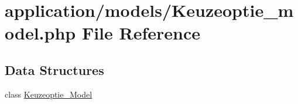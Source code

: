 \hypertarget{_keuzeoptie__model_8php}{}\section{application/models/\+Keuzeoptie\+\_\+model.php File Reference}
\label{_keuzeoptie__model_8php}
\subsection*{Data Structures}
\begin{DoxyCompactItemize}
\item 
class \mbox{\hyperlink{class_keuzeoptie___model}{Keuzeoptie\+\_\+\+Model}}
\end{DoxyCompactItemize}
